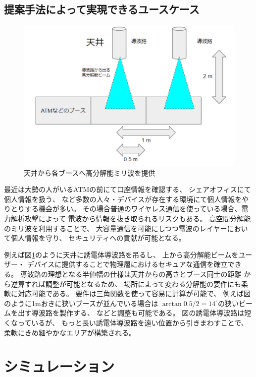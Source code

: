 \documentclass[technicalreport]{ieicej}
\begin{document}
\subsection{提案手法によって実現できるユースケース}

\begin{figure}[tb]
  \vspace{20mm}
  \begin{center}
    \includegraphics[bb=0 0 384 262, width=0.7\linewidth]{img/usecase.pdf}
    \caption{天井から各ブースへ高分解能ミリ波を提供}
    \label{fig:usecase}
  \end{center}
\end{figure}


最近は大勢の人がいるATMの前にて口座情報を確認する、
シェアオフィスにて個人情報を扱う、
など多数の人々・デバイスが存在する環境にて個人情報をやりとりする機会が多い。
その場合普通のワイヤレス通信を使っている場合、電力解析攻撃によって
電波から情報を抜き取られるリスクもある。
高空間分解能のミリ波を利用することで、
大容量通信を可能にしつつ電波のレイヤーにおいて個人情報を守り、
セキュリティへの貢献が可能となる。

例えば図\ref{fig:usecase}のように天井に誘電体導波路を吊るし、
上から高分解能ビームをユーザー・
デバイスに提供することで物理層におけるセキュアな通信を確立できる。
導波路の理想となる半値幅の仕様は天井からの高さとブース同士の距離
から逆算すれば調整が可能となるため、
場所によって変わる分解能の要件にも柔軟に対応可能である。
要件は三角関数を使って容易に計算が可能で、
例えば図のように1mおきに狭いブースが並んでいる場合は
$\arctan 0.5 / 2 = 14^{\circ}$の狭いビームを出す導波路を製作する、
などと調整も可能である。
図の誘電体導波路は短くなっているが、
もっと長い誘電体導波路を遠い位置から引きまわすことで、
柔軟にきめ細やかなエリアが構築される。


\section{シミュレーション}
\end{document}
